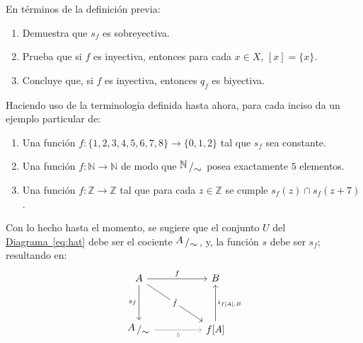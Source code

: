 \documentclass[letterpaper,DIV=14,headsepline,12pt]{scrartcl}
\newcommand{\pts}{}
\newenvironment{ejercicio}[1]{\ifthenelse{\equal{#1}{1} \OR
\equal{#1}{+1}}{\renewcommand{\pts}{\textbf{(#1
pt)}}}{\renewcommand{\pts}{\textbf{(#1 pts)}}}\begin{ejj}\upshape
\pts}{\end{ejj}}
\newcommand{\quot}[2]{{\raisebox{.2em}{$#1$}\left/\raisebox{-.2em}{$#2$}\right.}}
\begin{document}
    \begin{ejercicio}{1.5}
        En términos de la definición previa:
        \begin{enumerate}
            \item Demuestra que $s_f$ es sobreyectiva.
            \item Prueba que si $f$ es inyectiva, entonces para cada $x \in X$,
            $[x]=\{x\}$.
            \item Concluye que, si $f$ es inyectiva, entonces $q_f$ es
            biyectiva.
        \end{enumerate}
    \end{ejercicio}

    \begin{ejercicio}{1.5}
        Haciendo uso de la terminología definida hasta ahora, para cada inciso
        da un ejemplo particular de:
        \begin{enumerate}
            \item Una función $f\colon \{1,2,3,4,5,6,7,8\} \to \{0,1,2\}$ tal que
            $s_f$ sea constante.
            \item Una función $f\colon \mathbb{N} \to \mathbb{N}$ de modo que
            $\quot{\mathbb{N}}{\sim}$ posea exactamente $5$ elementos.
            \item Una función $f\colon \mathbb{Z} \to \mathbb{Z}$ tal que para cada $z
            \in \mathbb{Z}$ se cumple $s_f(z) \cap s_f(z+7)$.
        \end{enumerate}
    \end{ejercicio}

    Con lo hecho hasta el momento, se sugiere que el conjunto $U$ del
    \hyperref[eq:hat]{Diagrama~\ref*{eq:hat}} debe ser el cociente
    $\quot{A}{\sim}$, y, la función $s$ debe ser $s_f$; resultando en:
    \begin{equation}\label{eq:casi}
        \begin{tikzcd}
            A && B \\
            \\
            \quot{A}{\sim} && {f[A]}
            \arrow["f", from=1-1, to=1-3]
            \arrow["s_f"', from=1-1, to=3-1]
            \arrow["{\hat{f}}"{description}, from=1-1, to=3-3]
            \arrow["b"', from=3-1, to=3-3, draw=Cornsilk4, text=Cornsilk4]
            \arrow["{i_{f[A],B}}"', from=3-3, to=1-3]
        \end{tikzcd}
    \end{equation}
\end{document}
